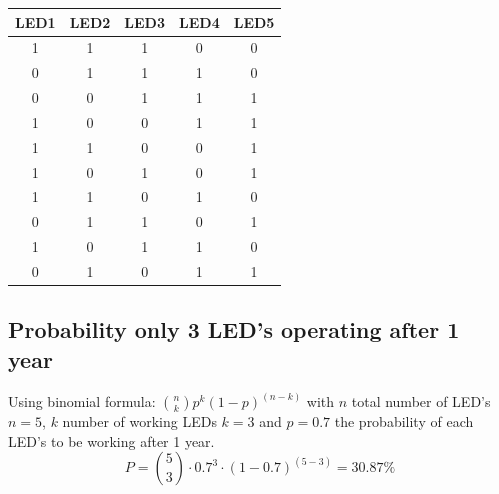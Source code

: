 \documentclass{article}
\begin{document}
{\renewcommand{\arraystretch}{1.25}%
\setlength{\arrayrulewidth}{0.15mm}
    \begin{center}
    \begin{tabular}{|c|c|c|c|c|}
    \hline
         LED1&   LED2&LED3&LED4 &LED5\\
    \hline
        1&   1&1&0&0\\
    \hline
        0&   1&1&1&0\\
    \hline
         0&   0&1&1&1\\
    \hline
          1&   0&0&1&1\\
    \hline
          1&   1&0&0&1\\
    \hline
         1&   0&1&0&1\\
    \hline
 1& 1& 0& 1&0\\ \hline 
 0& 1& 1& 0&1\\ \hline 
 1& 0& 1& 1&0\\\hline
 0& 1& 0& 1&1\\\hline
    \end{tabular}
    \end{center}
}

\subsection{Probability only 3 LED's operating after 1 year}
Using binomial formula: ${n \choose k}p^k(1-p)^{(n-k)}$ with $n$ total number of LED's $n=5$, $k$ number of working LEDs $k=3$ and $p=0.7$ the probability of each LED's to be working after 1 year.
\begin{equation}
    P = {5 \choose 3 } \cdot 0.7 ^ 3 \cdot (1-0.7)^{(5-3)} = 30.87\%
\end{equation}
\end{document}
